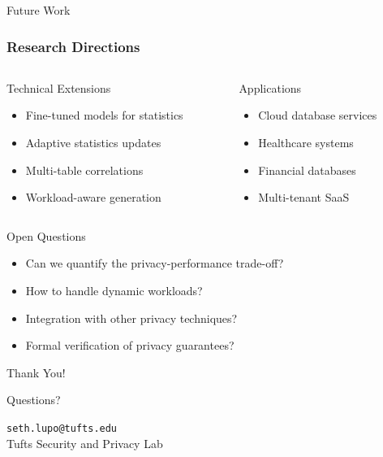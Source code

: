 \documentclass{beamer}
\begin{document}
\begin{frame}{Future Work}
\frametitle{Research Directions}

\begin{columns}[T]
\begin{column}{0.5\textwidth}
\begin{block}{Technical Extensions}
\begin{itemize}
    \item Fine-tuned models for statistics
    \item Adaptive statistics updates
    \item Multi-table correlations
    \item Workload-aware generation
\end{itemize}
\end{block}
\end{column}

\begin{column}{0.5\textwidth}
\begin{block}{Applications}
\begin{itemize}
    \item Cloud database services
    \item Healthcare systems
    \item Financial databases
    \item Multi-tenant SaaS
\end{itemize}
\end{block}
\end{column}
\end{columns}

\vspace{0.5cm}

\begin{alertblock}{Open Questions}
\begin{itemize}
    \item Can we quantify the privacy-performance trade-off?
    \item How to handle dynamic workloads?
    \item Integration with other privacy techniques?
    \item Formal verification of privacy guarantees?
\end{itemize}
\end{alertblock}

\end{frame}

\begin{frame}
\begin{center}
\Huge Thank You!

\vspace{1cm}

\Large Questions?

\vspace{1cm}

\normalsize
\texttt{seth.lupo@tufts.edu}\\
\vspace{0.5cm}
Tufts Security and Privacy Lab

\end{center}
\end{frame}
\end{document}

